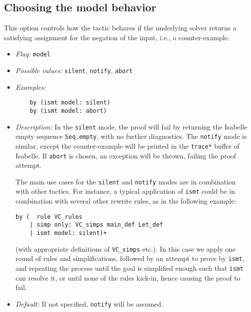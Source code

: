\documentclass{article}
\begin{document}
\subsection{Choosing the model behavior}
This option controls how the tactic behaves if the underlying solver returns a satisfying assignment 
for the negation of the input, i.e., a counter-example. 
\begin{itemize}
\item {\em Flag:} {\tt model}
\item {\em Possible values:} {\tt silent}, {\tt notify}, {\tt abort}
\item {\em Examples:} 
\begin{verbatim}
    by (ismt model: silent)
    by (ismt model: abort)
\end{verbatim}
\item {\em Description:} In the {\tt silent} mode, the proof will fail by returning the 
Isabelle empty sequence {\tt Seq.empty}, with no further diagnostics. The
{\tt notify} mode is similar, except the counter-example will be printed in the {\tt *trace*} buffer of
Isabelle. If {\tt abort} is chosen, an exception will be thrown, failing the proof attempt.

The main use cases for the {\tt silent} and {\tt notify} modes are in combination with other tactics. 
For instance, a typical application of {\tt ismt} could be in combination with several other rewrite rules,
as in the following example:
\begin{verbatim}
by (  rule VC_rules 
    | simp only: VC_simps main_def Let_def 
    | ismt model: silent)+
\end{verbatim}
(with appropriate definitions of {\tt VC\_simps} etc.). In this case we apply one round
of rules and simplifications, followed by an attempt to prove by {\tt ismt}, and repeating the process until the 
goal is simplified enough such that {\tt ismt} can resolve it, or until none of the rules kick-in, hence causing the
proof to fail.
\item {\em Default:} If not specified, {\tt notify} will be assumed.
\end{itemize}
\end{document}
